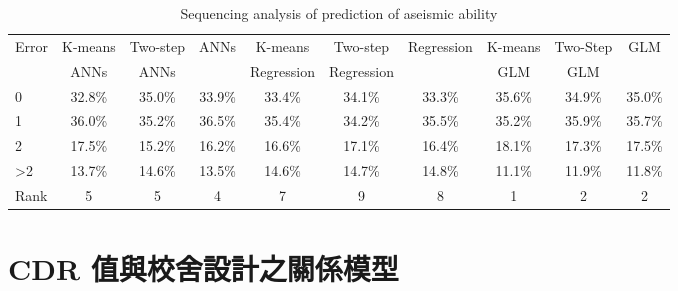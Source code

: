 
\begin{table}[hbtp]
  \begin{center}
    \caption{Sequencing analysis of prediction of aseismic ability}
    \label{tab:is_seq_result}
    \scriptsize
    \begin{tabular}{l c c c c c c c c c}
      \hline
       Error & K-means & Two-step & ANNs & K-means    & Two-step   & Regression & K-means & Two-Step & GLM \\
             &   ANNs  &   ANNs   &      & Regression & Regression &            &   GLM   &   GLM    & \\ 
      \hline
	   0  & 32.8\% & 35.0\% & 33.9\% & 33.4\% & 34.1\% & 33.3\% & 35.6\% & 34.9\% & 35.0\% \\
	   1  & 36.0\% & 35.2\% & 36.5\% & 35.4\% & 34.2\% & 35.5\% & 35.2\% & 35.9\% & 35.7\% \\
	   2  & 17.5\% & 15.2\% & 16.2\% & 16.6\% & 17.1\% & 16.4\% & 18.1\% & 17.3\% & 17.5\% \\
	   >2 & 13.7\% & 14.6\% & 13.5\% & 14.6\% & 14.7\% & 14.8\% & 11.1\% & 11.9\% & 11.8\% \\
      \hline
      Rank & 5 & 5 & 4 & 7 & 9 & 8 & 1 & 2 & 2 \\
      \hline
      \end{tabular}
  \end{center}
\end{table}

\section{CDR 值與校舍設計之關係模型}

